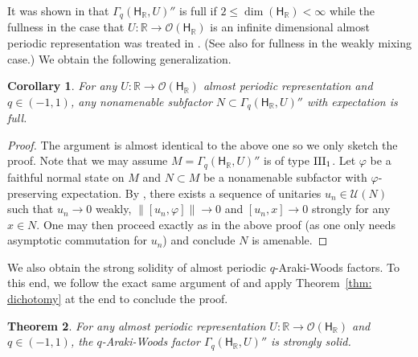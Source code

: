 \documentclass[a4paper,11pt]{amsart}
\newtheorem{thm}{Theorem}[section]
\newtheorem{cor}[thm]{Corollary}
\theoremstyle{definition}
\newcommand{\R}{{\mathbb R}}
\newcommand{\cO}{{\mathcal O}}
\newcommand{\cU}{{\mathcal U}}
\newcommand{\sH}{\mathsf{H}}
\begin{document}
It was shown in \cite{KSW23} that $\Gamma_q(\sH_\R, U)''$ is full if $2\leq \dim(\sH_\R)<\infty$
	while the fullness in the case that $U:\R\to \cO(\sH_\R)$ is an infinite dimensional almost periodic representation
	was treated in \cite{KW24}.
(See also \cite{HoIs20} for fullness in the weakly mixing case.)
We obtain the following generalization. 
	
\begin{cor}\label{cor: fullness}
For any $U: \R\to \cO(\sH_\R)$ almost periodic representation 
	and $q\in (-1,1)$,
	any nonamenable subfactor $N\subset \Gamma_q(\sH_\R, U)''$ with expectation is full.
\end{cor}
\begin{proof}
The argument is almost identical to the above one so we only sketch the proof.
Note that we may assume $M=\Gamma_q(\sH_\R, U)''$ is of type ${\rm III}_1$. Let $\varphi$ be a faithful normal state on $M$ and 
	$N\subset M$ be a nonamenable subfactor with $\varphi$-preserving expectation.
By \cite[Corollary 2.6]{HoRa15}, there exists a sequence of unitaries $u_n\in \cU(N)$ such that $u_n\to 0$ weakly,
	$\|[u_n,\varphi]\|\to 0$ and $[u_n,x]\to 0$ strongly for any $x\in N$.
One may then proceed exactly as in the above proof (as one only needs asymptotic commutation for $u_n$)
	and conclude $N$ is amenable.
\end{proof}

We also obtain the strong solidity of almost periodic $q$-Araki-Woods factors.
To this end, we follow the exact same argument of \cite{BHV18} and apply Theorem~\ref{thm: dichotomy} at the end to conclude the proof.

\begin{thm}\label{thm: strong solid}
For any almost periodic representation $U: \R\to \cO(\sH_\R)$  and $q\in (-1,1)$,
	the $q$-Araki-Woods factor $\Gamma_q(\sH_\R, U)''$ is strongly solid.
\end{thm}
\end{document}
